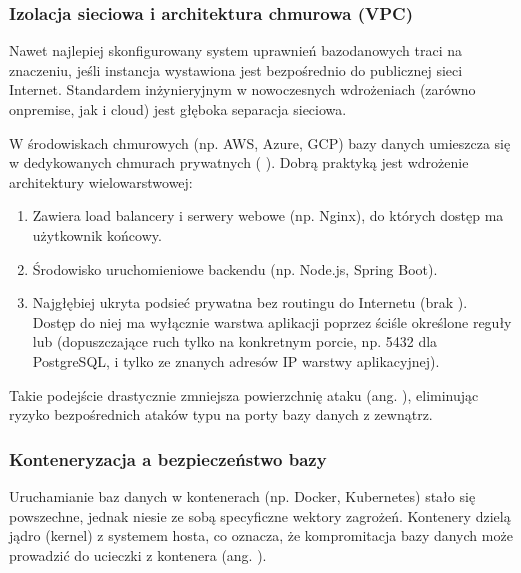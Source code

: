 \documentclass[letterpaper,10pt,english]{sphinxmanual}
\begin{document}
\subsubsection{Izolacja sieciowa i architektura chmurowa (VPC)}
\label{\detokenize{rozdzial_2/rozdzial_27/rozdzial_1:izolacja-sieciowa-i-architektura-chmurowa-vpc}}
\sphinxAtStartPar
Nawet najlepiej skonfigurowany system uprawnień bazodanowych traci na znaczeniu, jeśli instancja wystawiona jest bezpośrednio do publicznej sieci Internet. Standardem inżynieryjnym w nowoczesnych wdrożeniach (zarówno on\sphinxhyphen{}premise, jak i cloud) jest głęboka separacja sieciowa.

\sphinxAtStartPar
W środowiskach chmurowych (np. AWS, Azure, GCP) bazy danych umieszcza się w dedykowanych chmurach prywatnych ( \sphinxhyphen{} ). Dobrą praktyką jest wdrożenie architektury wielowarstwowej:
\begin{enumerate}
%
\item {} 
\sphinxAtStartPar
{} Zawiera load balancery i serwery webowe (np. Nginx), do których dostęp ma użytkownik końcowy.

\item {} 
\sphinxAtStartPar
{} Środowisko uruchomieniowe backendu (np. Node.js, Spring Boot).

\item {} 
\sphinxAtStartPar
{} Najgłębiej ukryta podsieć prywatna bez routingu do Internetu (brak ). Dostęp do niej ma wyłącznie warstwa aplikacji poprzez ściśle określone reguły  lub  (dopuszczające ruch tylko na konkretnym porcie, np. 5432 dla PostgreSQL, i tylko ze znanych adresów IP warstwy aplikacyjnej).

\end{enumerate}

\sphinxAtStartPar
Takie podejście drastycznie zmniejsza powierzchnię ataku (ang. ), eliminując ryzyko bezpośrednich ataków typu  na porty bazy danych z zewnątrz.


\subsubsection{Konteneryzacja a bezpieczeństwo bazy}
\label{\detokenize{rozdzial_2/rozdzial_27/rozdzial_1:konteneryzacja-a-bezpieczenstwo-bazy}}
\sphinxAtStartPar
Uruchamianie baz danych w kontenerach (np. Docker, Kubernetes) stało się powszechne, jednak niesie ze sobą specyficzne wektory zagrożeń. Kontenery dzielą jądro (kernel) z systemem hosta, co oznacza, że kompromitacja bazy danych może prowadzić do ucieczki z kontenera (ang. ).
\end{document}
